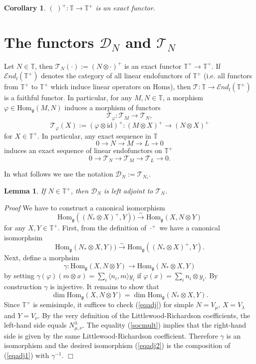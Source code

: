 \documentclass[11pt]{amsart}
\newcounter{theorem}
\newtheorem{lemma}[theo]{Lemma}
\newtheorem{corollary}[theo]{Corollary}
\renewenvironment{proof}{ \emph{Proof}}{$\Box$}
\newcommand{\TT}{\mathbb{T}}
\newcommand{\id}{\mathrm{id}}
\renewcommand{\gg}{\mathfrak{g}}
\newcommand{\Hom}{\mathrm{Hom}}
\newcommand{\field}[1]{\mathbb{#1}}
\begin{document}
\begin{corollary}\label{cor2}
$(\;)^+:\field T\to \field T^+$ is an exact functor.
\end{corollary}



\section{The functors $\mathcal D_N$ and $\mathcal T_N$}

Let $N\in\mathbb T$, then $\mathcal T_N(\cdot):=(N\otimes \cdot)^+$ is an exact functor $\mathbb T^+\to\mathbb T^+$. 
If $\mathcal{E}nd_l(\mathbb T^+)$ denotes the category of all linear
endofunctors of $\mathbb T^+$ (i.e. all functors from $\TT^+$ to $\TT^+$ which induce linear operators on Homs), 
then $\mathcal T:\TT\to\mathcal{E}nd_l(\TT^+)$ is a faithful functor.
In particular, for any $M,N\in\TT$, a morphism $\varphi\in\Hom_\gg(M,N)$ induces a morphism of functors 
$$\mathcal T_{\varphi}:\mathcal T_M\to\mathcal T_N,$$
$$\mathcal T_{\varphi}(X):=(\varphi\otimes\id)^+:(M\otimes X)^+\to(N\otimes X)^+$$ 
for $X\in\TT^+$.
In particular, any exact sequence in $\TT$ 
$$0\to N\to M \to L\to 0$$
induces an exact sequence of linear endofunctors on $\TT^+$
$$0\to \mathcal T_N\to \mathcal T_M \to \mathcal T_L\to 0.$$


In what follows we use the notation $\mathcal D_N:=\mathcal T_{N_*}$.

\begin{lemma}\label{adjoint} If $N\in\TT^+$, then $\mathcal D_N$ is left adjoint to $\mathcal T_N$.
\end{lemma}
\begin{proof} We have to construct a canonical isomorphism
\begin{equation}\label{eqadj2}
\Hom_\gg((N_*\otimes X)^+,Y))\xrightarrow{\sim} \Hom_\gg(X,N\otimes Y)
\end{equation}
for any $X,Y\in\TT^+$. 
First, from the definition of ${\cdot}^+$ we have a canonical isomorphsim
\begin{equation}\label{eqadj1}
\Hom_\gg(N_*\otimes X,Y))\xrightarrow{\sim}\Hom_\gg((N_*\otimes X)^+,Y).
\end{equation}
Next, define a morphsim 
$$\gamma: \Hom_\gg(X,N\otimes Y)\to \Hom_\gg(N_*\otimes X,Y)$$
by setting $\gamma(\varphi)(m\otimes x)=\sum_i \langle n_i,m\rangle y_i$
if $\varphi(x)=\sum_i n_i\otimes y_i$.
By construction $\gamma$ is injective. It remains to show that
\begin{equation}\label{eqadj}
\dim\Hom_\gg(X,N\otimes Y)= \dim\Hom_\gg(N_*\otimes X,Y).
\end{equation}
Since $\TT^+$ is semisimple, it suffices to check (\ref{eqadj}) for
simple $N=V_\mu$, $X=V_\lambda$ and $Y=V_\nu$. By the very definition of the Littlewood-Richardson coefficients, the left-hand side equals
$N^{\lambda}_{\mu,\nu}$. The equality (\ref{socmult}) implies that the right-hand side is given by the same Littlewood-Richardson coefficient.
Therefore $\gamma$ is an isomorphism and the desired isomorphism (\ref{eqadj2}) is the composition of (\ref{eqadj1}) with $\gamma^{-1}$.
\end{proof}
\end{document}
